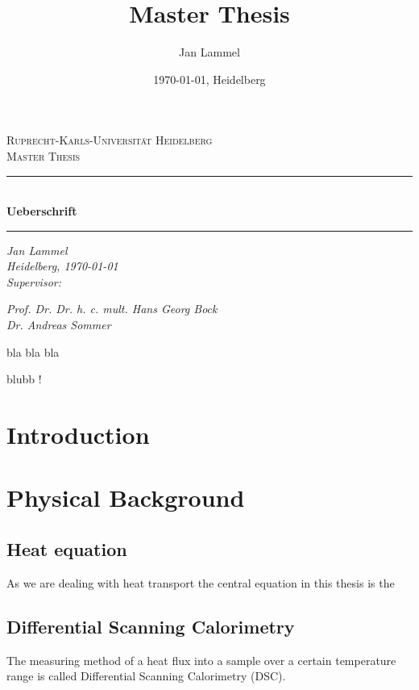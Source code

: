 \documentclass{scrartcl}[12pt, halfparskip]
\title{Master Thesis}
\author{Jan Lammel}
\date{\today{}, Heidelberg}
\begin{document}
\begin{titlepage}
	\begin{center}
	
	\textsc{\large Ruprecht-Karls-Universit\"{a}t Heidelberg} \\[0.5cm]
	\textsc{\large Master Thesis}\\[1cm]
	
	\newcommand{\HRule}{\rule{\linewidth}{0.5mm}}
	\HRule \\[0.4cm]
	\huge \bfseries Ueberschrift
	\HRule 
	
	\vspace{11cm}
	
	\Large \textit{Jan Lammel }\\
	\Large \textit{Heidelberg, \today }\\ \vspace{0.5cm}
	\Large \textit{Supervisor:}
	
	\Large \textit{Prof. Dr. Dr. h. c. mult. Hans Georg Bock}\\
	\Large \textit{Dr. Andreas Sommer}
	
	\end{center}
\end{titlepage}

\newpage

\tableofcontents 
\newpage

 

 bla bla bla
 
 
 \newpage

blubb !

\newpage
{}
\section{Introduction}

\section{Physical Background}
\subsection{Heat equation}
As we are dealing with heat transport the central equation in this thesis is the


\subsection{Differential Scanning Calorimetry}
The measuring method of a heat flux into a sample over a certain temperature range is called Differential Scanning Calorimetry (DSC). 
\end{document}
